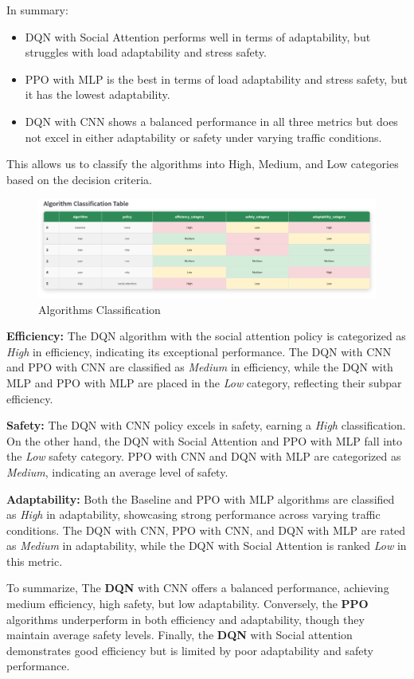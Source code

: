 In summary:

\begin{itemize}
    \item DQN with Social Attention performs well in terms of adaptability, but struggles with load adaptability and stress safety.
    \item PPO with MLP is the best in terms of load adaptability and stress safety, but it has the lowest adaptability.
    \item DQN with CNN shows a balanced performance in all three metrics but does not excel in either adaptability or safety under varying traffic conditions.
\end{itemize}

This allows us to classify the algorithms into High, Medium, and Low categories based on the decision criteria.

\begin{figure}[H]
    \centering
    \includegraphics[height=0.22\textheight]{images/app_indicators_classif.png} 
    \caption{Algorithms Classification}
\end{figure}

\textbf{Efficiency:}  
The DQN algorithm with the social attention policy is categorized as \textit{High} in efficiency, indicating its exceptional performance.  
The DQN with CNN and PPO with CNN are classified as \textit{Medium} in efficiency, while the DQN with MLP and PPO with MLP are placed in the \textit{Low} category, reflecting their subpar efficiency.

\textbf{Safety:}  
The DQN with CNN policy excels in safety, earning a \textit{High} classification.  
On the other hand, the DQN with Social Attention and PPO with MLP fall into the \textit{Low} safety category.  
PPO with CNN and DQN with MLP are categorized as \textit{Medium}, indicating an average level of safety.

\textbf{Adaptability:}  
Both the Baseline and PPO with MLP algorithms are classified as \textit{High} in adaptability, showcasing strong performance across varying traffic conditions.  
The DQN with CNN, PPO with CNN, and DQN with MLP are rated as \textit{Medium} in adaptability, while the DQN with Social Attention is ranked \textit{Low} in this metric.

To summarize, The \textbf{DQN} with CNN offers a balanced performance, achieving medium efficiency, high safety, but low adaptability. 
Conversely, the \textbf{PPO} algorithms underperform in both efficiency and adaptability, though they maintain average safety levels. 
Finally, the \textbf{DQN} with Social attention demonstrates good efficiency but is limited by poor adaptability and safety performance.
